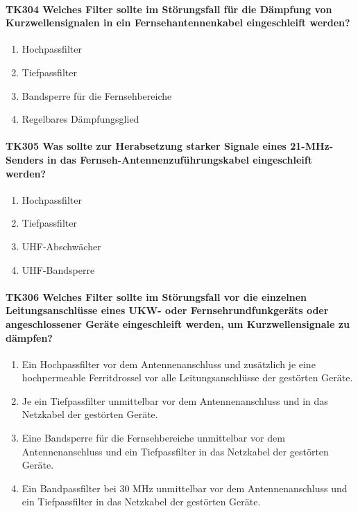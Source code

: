 \documentclass[8pt]{article}
\begin{document}
\paragraph*{TK304 Welches Filter sollte im Störungsfall für die Dämpfung von Kurzwellensignalen in ein Fernsehantennenkabel eingeschleift werden?} 
\begin{enumerate}[nolistsep,label=\Alph*]
\item Hochpassfilter
\item Tiefpassfilter
\item Bandsperre für die Fernsehbereiche
\item Regelbares Dämpfungsglied
\end{enumerate}

\paragraph*{TK305 Was sollte zur Herabsetzung starker Signale eines 21-MHz-Senders in das Fernseh-Antennenzuführungskabel eingeschleift werden?}
\begin{enumerate}[nolistsep,label=\Alph*]
\item Hochpassfilter
\item Tiefpassfilter
\item UHF-Abschwächer
\item UHF-Bandsperre
\end{enumerate}

\paragraph*{TK306 Welches Filter sollte im Störungsfall vor die einzelnen Leitungsanschlüsse eines UKW- oder Fernsehrundfunkgeräts oder angeschlossener Geräte eingeschleift werden, um Kurzwellensignale zu dämpfen?}
\begin{enumerate}[nolistsep,label=\Alph*]
\item Ein Hochpassfilter vor dem Antennenanschluss und zusätzlich je eine hochpermeable Ferritdrossel vor alle Leitungsanschlüsse der gestörten Geräte.
\item Je ein Tiefpassfilter unmittelbar vor dem Antennenanschluss und in das Netzkabel der gestörten Geräte.
\item Eine Bandsperre für die Fernsehbereiche unmittelbar vor dem Antennenanschluss und ein Tiefpassfilter in das Netzkabel der gestörten Geräte.
\item Ein Bandpassfilter bei 30 MHz unmittelbar vor dem Antennenanschluss und ein Tiefpassfilter in das Netzkabel der gestörten Geräte. 
\end{enumerate}
\end{document}

